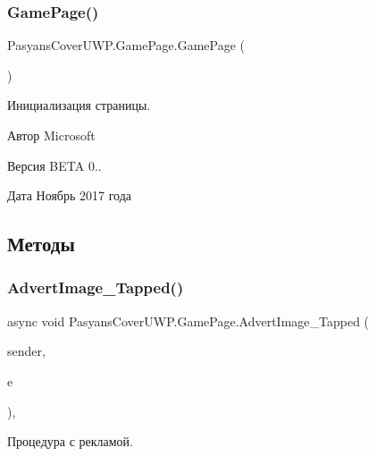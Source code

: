\subsubsection{\texorpdfstring{Game\+Page()}{GamePage()}}
{\footnotesize\ttfamily Pasyans\+Cover\+U\+W\+P.\+Game\+Page.\+Game\+Page (\begin{DoxyParamCaption}{ }\end{DoxyParamCaption})\hspace{0.3cm}{\ttfamily [inline]}}



Инициализация страницы. 

\begin{DoxyAuthor}{Автор}
Microsoft 
\end{DoxyAuthor}
\begin{DoxyVersion}{Версия}
B\+E\+TA 0.. 
\end{DoxyVersion}
\begin{DoxyDate}{Дата}
Ноябрь 2017 года 
\end{DoxyDate}


\subsection{Методы}
\mbox{\label{class_pasyans_cover_u_w_p_1_1_game_page_a31a97c290129f77a91f790207391350c}} 
\subsubsection{\texorpdfstring{Advert\+Image\+\_\+\+Tapped()}{AdvertImage\_Tapped()}}
{\footnotesize\ttfamily async void Pasyans\+Cover\+U\+W\+P.\+Game\+Page.\+Advert\+Image\+\_\+\+Tapped (\begin{DoxyParamCaption}\item[{object}]{sender,  }\item[{Tapped\+Routed\+Event\+Args}]{e }\end{DoxyParamCaption})\hspace{0.3cm}{\ttfamily [inline]}, {\ttfamily [private]}}



Процедура с рекламой. 

